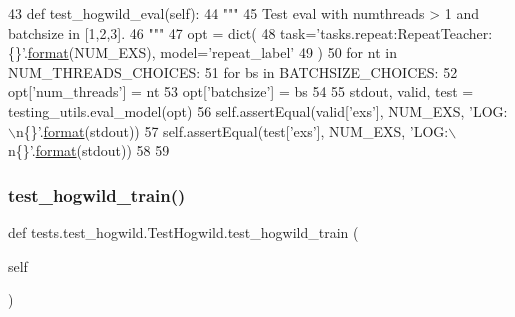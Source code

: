 \begin{DoxyCode}
43     \textcolor{keyword}{def }test\_hogwild\_eval(self):
44         \textcolor{stringliteral}{"""}
45 \textcolor{stringliteral}{        Test eval with numthreads > 1 and batchsize in [1,2,3].}
46 \textcolor{stringliteral}{        """}
47         opt = dict(
48             task=\textcolor{stringliteral}{'tasks.repeat:RepeatTeacher:\{\}'}.\hyperlink{namespaceparlai_1_1chat__service_1_1services_1_1messenger_1_1shared__utils_a32e2e2022b824fbaf80c747160b52a76}{format}(NUM\_EXS), model=\textcolor{stringliteral}{'repeat\_label'}
49         )
50         \textcolor{keywordflow}{for} nt \textcolor{keywordflow}{in} NUM\_THREADS\_CHOICES:
51             \textcolor{keywordflow}{for} bs \textcolor{keywordflow}{in} BATCHSIZE\_CHOICES:
52                 opt[\textcolor{stringliteral}{'num\_threads'}] = nt
53                 opt[\textcolor{stringliteral}{'batchsize'}] = bs
54 
55                 stdout, valid, test = testing\_utils.eval\_model(opt)
56                 self.assertEqual(valid[\textcolor{stringliteral}{'exs'}], NUM\_EXS, \textcolor{stringliteral}{'LOG:\(\backslash\)n\{\}'}.\hyperlink{namespaceparlai_1_1chat__service_1_1services_1_1messenger_1_1shared__utils_a32e2e2022b824fbaf80c747160b52a76}{format}(stdout))
57                 self.assertEqual(test[\textcolor{stringliteral}{'exs'}], NUM\_EXS, \textcolor{stringliteral}{'LOG:\(\backslash\)n\{\}'}.\hyperlink{namespaceparlai_1_1chat__service_1_1services_1_1messenger_1_1shared__utils_a32e2e2022b824fbaf80c747160b52a76}{format}(stdout))
58 
59 
\end{DoxyCode}
\mbox{\label{classtests_1_1test__hogwild_1_1TestHogwild_a8ae07bb2d6dda177244cecb1900211b5}} 
\subsubsection{\texorpdfstring{test\+\_\+hogwild\+\_\+train()}{test\_hogwild\_train()}}
{\footnotesize\ttfamily def tests.\+test\+\_\+hogwild.\+Test\+Hogwild.\+test\+\_\+hogwild\+\_\+train (\begin{DoxyParamCaption}\item[{}]{self }\end{DoxyParamCaption})}

